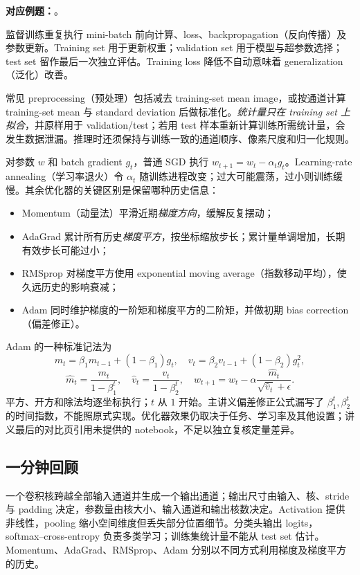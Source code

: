 \textbf{对应例题：}。


监督训练重复执行 mini-batch 前向计算、loss、backpropagation（反向传播）及参数更新。Training set 用于更新权重；validation set 用于模型与超参数选择；test set 留作最后一次独立评估。Training loss 降低不自动意味着 generalization（泛化）改善。

常见 preprocessing（预处理）包括减去 training-set mean image，或按通道计算 training-set mean 与 standard deviation 后做标准化。\emph{统计量只在 training set 上拟合}，并原样用于 validation/test；若用 test 样本重新计算训练所需统计量，会发生数据泄漏。推理时还须保持与训练一致的通道顺序、像素尺度和归一化规则。


对参数 $w$ 和 batch gradient $g_t$，普通 SGD 执行 $w_{t+1}=w_t-\alpha_t g_t$。Learning-rate annealing（学习率退火）令 $\alpha_t$ 随训练进程改变；过大可能震荡，过小则训练缓慢。其余优化器的关键区别是保留哪种历史信息：
\begin{itemize}
  \item Momentum（动量法）平滑近期\emph{梯度方向}，缓解反复摆动；
  \item AdaGrad 累计所有历史\emph{梯度平方}，按坐标缩放步长；累计量单调增加，长期有效步长可能过小；
  \item RMSprop 对梯度平方使用 exponential moving average（指数移动平均），使久远历史的影响衰减；
  \item Adam 同时维护梯度的一阶矩和梯度平方的二阶矩，并做初期 bias correction（偏差修正）。
\end{itemize}

Adam 的一种标准记法为
\[
  m_t=\beta_1m_{t-1}+(1-\beta_1)g_t,
  \quad v_t=\beta_2v_{t-1}+(1-\beta_2)g_t^2,
\]
\[
  \hat m_t=\frac{m_t}{1-\beta_1^t},
  \quad \hat v_t=\frac{v_t}{1-\beta_2^t},
  \quad w_{t+1}=w_t-\alpha\frac{\hat m_t}{\sqrt{\hat v_t}+\epsilon}.
\]
平方、开方和除法均逐坐标执行；$t$ 从 $1$ 开始。主讲义偏差修正公式漏写了 $\beta_1^t,\beta_2^t$ 的时间指数，不能照原式实现。优化器效果仍取决于任务、学习率及其他设置；讲义最后的对比页引用未提供的 notebook，不足以独立复核定量差异。

\subsection{一分钟回顾}

一个卷积核跨越全部输入通道并生成一个输出通道；输出尺寸由输入、核、stride 与 padding 决定，参数量由核大小、输入通道和输出核数决定。Activation 提供非线性，pooling 缩小空间维度但丢失部分位置细节。分类头输出 logits，softmax--cross-entropy 负责多类学习；训练集统计量不能从 test set 估计。Momentum、AdaGrad、RMSprop、Adam 分别以不同方式利用梯度及梯度平方的历史。
